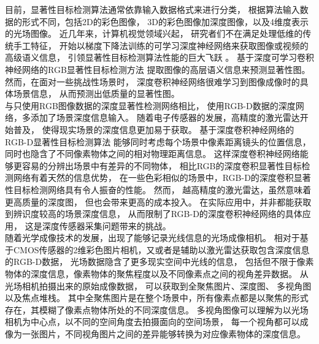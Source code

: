 %
%
%
目前，显著性目标检测算法通常依靠输入数据格式来进行分类，
根据算法输入数据的形式不同，包括2D的彩色图像，
3D的彩色图像加深度图像，以及4维度表示的光场图像。
近几年来，计算机视觉领域兴起，
研究者们不在满足处理低维的传统手工特征，
开始以梯度下降法训练的可学习深度神经网络来获取图像或视频的高级语义信息，
引领显著性目标检测算法性能的巨大飞跃
。
基于深度可学习卷积神经网络的RGB显著性目标检测方法
提取图像的高层语义信息来预测显著性图。
然而，在面对一些挑战性场景时，
深度卷积神经网络很难学习到图像成像时的具体场景信息，
从而预测出低质量的显著性图。
\\
%
%
%
%
\indent
与只使用RGB图像数据的深度显著性检测网络相比，
使用RGB-D数据的深度网络，多添加了场景深度信息输入。
随着电子传感器的发展，高精度的激光雷达开始普及，
使得现实场景的深度信息更加易于获取。
基于深度卷积神经网络的RGB-D显著性目标检测算法
能够同时考虑每个场景中像素距离镜头的位置信息，同时也隐含了不同像素物体之间的相对物理距离信息。
这样深度卷积神经网络能够更容易的分辨出场景中有差异的不同物体，
相比RGB的深度卷积显著性目标检测网络有着天然的信息优势，
在一些色彩相似的场景中，RGB-D的深度卷积显著性目标检测网络具有令人振奋的性能。
然而，
越高精度的激光雷达，虽然意味着更高质量的深度图，
但也会带来更高的成本投入。
在实际应用中，并非都能获取到辨识度较高的场景深度信息，
从而限制了RGB-D的深度卷积神经网络的具体应用，
这是深度传感器采集问题带来的挑战。
\\
%
%
%
%
\indent
随着光学成像技术的发展，出现了能够记录光线信息的光场成像相机。
相对于基于CMOS传感器的2维彩色图片相机，又或者是辅助以激光雷达获取包含深度信息的RGB-D数据，
光场数据隐含了更多现实空间中光线的信息，
包括但不限于像素物体的深度信息，像素物体的聚焦程度以及不同像素点之间的视角差异数据。
从光场相机拍摄出来的原始成像数据，
可以获取到全聚焦图片、深度图、
多视角图以及焦点堆栈。
其中全聚焦图片是在整个场景中，所有像素点都是以聚焦的形式存在，其模糊了像素点物体所处的不同深度信息。
多视角图像可以理解为以光场相机为中心点，以不同的空间角度去拍摄面向的空间场景，
每一个视角都可以成像为一张图片，不同视角图片之间的差异能够转换为对应像素物体的深度信息。
